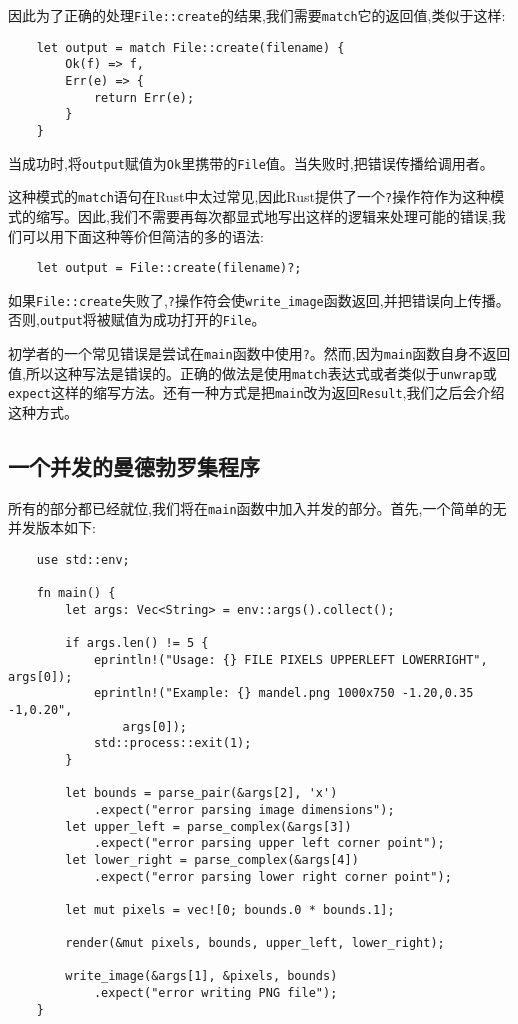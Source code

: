 因此为了正确的处理\texttt{File::create}的结果,我们需要\texttt{match}它的返回值,类似于这样:
\begin{verbatim}
    let output = match File::create(filename) {
        Ok(f) => f,
        Err(e) => {
            return Err(e);
        }
    }
\end{verbatim}

当成功时,将\texttt{output}赋值为\texttt{Ok}里携带的\texttt{File}值。当失败时,把错误传播给调用者。

这种模式的\texttt{match}语句在Rust中太过常见,因此Rust提供了一个\texttt{?}操作符作为这种模式的缩写。因此,我们不需要再每次都显式地写出这样的逻辑来处理可能的错误,我们可以用下面这种等价但简洁的多的语法:
\begin{verbatim}
    let output = File::create(filename)?;
\end{verbatim}

如果\texttt{File::create}失败了,\texttt{?}操作符会使\texttt{write\_image}函数返回,并把错误向上传播。否则,\texttt{output}将被赋值为成功打开的\texttt{File}。

\begin{note}
    初学者的一个常见错误是尝试在\texttt{main}函数中使用\texttt{?}。然而,因为\texttt{main}函数自身不返回值,所以这种写法是错误的。正确的做法是使用\texttt{match}表达式或者类似于\texttt{unwrap}或\texttt{expect}这样的缩写方法。还有一种方式是把\texttt{main}改为返回\texttt{Result},我们之后会介绍这种方式。
\end{note}

\subsection{一个并发的曼德勃罗集程序}\label{mandelbrot}
所有的部分都已经就位,我们将在\texttt{main}函数中加入并发的部分。首先,一个简单的无并发版本如下:
\begin{verbatim}
    use std::env;

    fn main() {
        let args: Vec<String> = env::args().collect();

        if args.len() != 5 {
            eprintln!("Usage: {} FILE PIXELS UPPERLEFT LOWERRIGHT",     args[0]);
            eprintln!("Example: {} mandel.png 1000x750 -1.20,0.35   -1,0.20",
                args[0]);
            std::process::exit(1);
        }

        let bounds = parse_pair(&args[2], 'x')
            .expect("error parsing image dimensions");
        let upper_left = parse_complex(&args[3])
            .expect("error parsing upper left corner point");
        let lower_right = parse_complex(&args[4])
            .expect("error parsing lower right corner point");

        let mut pixels = vec![0; bounds.0 * bounds.1];

        render(&mut pixels, bounds, upper_left, lower_right);

        write_image(&args[1], &pixels, bounds)
            .expect("error writing PNG file");
    }
\end{verbatim}

